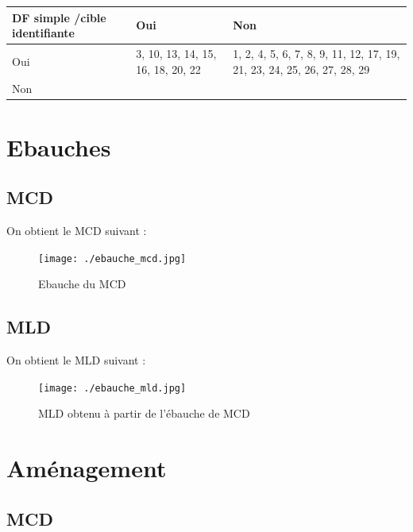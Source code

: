 \documentclass[12pt,french,titlepage]{article}
\begin{document}
    \begin{tabular}{|p{4cm}|p{5cm}|p{5cm}|}
    \hline
        DF simple /cible identifiante & Oui & Non\\
        \hline
        Oui &  3, 10, 13, 14, 15, 16, 18, 20, 22  
        & 1, 2, 4, 5, 6, 7, 8, 9, 11, 12, 17, 19, 21, 23, 24, 25, 26, 27, 28, 29 \\
         \hline
        Non & & \\
        \hline
        
        
    \end{tabular}

	    
	   \section{Ebauches}
	   
	   \subsection{MCD}
	   On obtient le MCD suivant :
    \begin{figure}[H]
	      \centering
	      \texttt{[image: ./ebauche\_mcd.jpg]}
	      \caption{Ebauche du MCD}
	      
	   
	      
	  \end{figure}
	  
	  \subsection{MLD}
	  
	  On obtient le MLD suivant :

    \begin{figure}[H]
	      \centering
	      \texttt{[image: ./ebauche\_mld.jpg]}
	      \caption{MLD obtenu à partir de l'ébauche de MCD}
	      
	   
	      
	  \end{figure}
    
    \section{Aménagement}
    
    \subsection{MCD}
    
\end{document}
